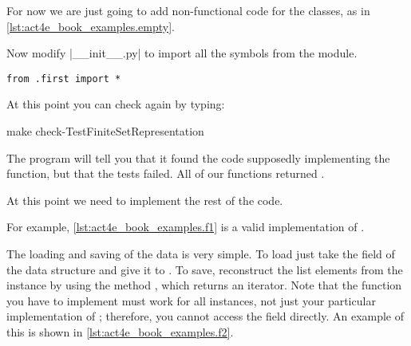 For now we are just going to add non-functional code for the classes,
as in \cref{lst:act4e_book_examples.empty}.

\begin{longcode}
    \caption{}

    \label{lst:act4e_book_examples.empty}
\end{longcode}

Now modify \files|__init__.py| to import all the symbols from the  module.

\begin{verbatim}
from .first import *
\end{verbatim}

At this point you can check again by typing:

\begin{console}
    make check-TestFiniteSetRepresentation
\end{console}

The program will tell you that it found the code supposedly implementing the function,
but that the tests failed.
All of our functions returned .

At this point we need to implement the rest of the code.

For example, \cref{lst:act4e_book_examples.f1} is a valid implementation of \FiniteSet.

\begin{longcode}
    \caption{}
    \label{lst:act4e_book_examples.f1}
\end{longcode}

The loading and saving of the data is very simple.
To load just take the  field of the data structure and give it to .
To save, reconstruct the list elements from the  instance by using the method , which returns an iterator.
Note that the  function you have to implement must work for all \FiniteSet instances, not just your particular implementation of \FiniteSet; therefore, you cannot access the  field directly.
An example of this is shown in \cref{lst:act4e_book_examples.f2}.

\begin{longcode}
    \caption{}
    \label{lst:act4e_book_examples.f2}
\end{longcode}

